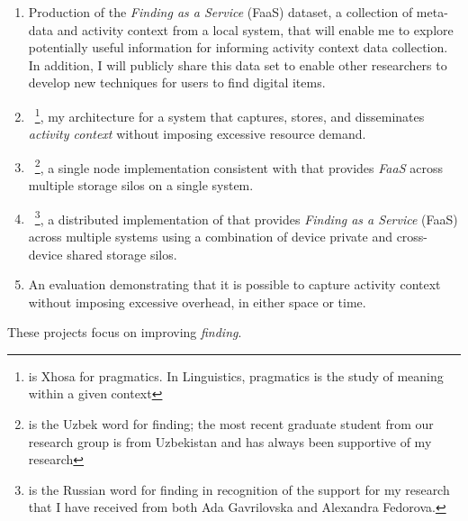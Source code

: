 \begin{enumerate}
    \item Production of the \emph{Finding as a Service} (FaaS) dataset, a
          collection of meta-data and activity context from a local system, that
          will enable me to explore potentially useful information for informing
          activity context data collection. In addition, I will publicly
          share this data set to enable other researchers to develop new
          techniques for users to find digital items.

    \item \system~\footnote{\system is Xhosa for pragmatics.  In Linguistics,
              pragmatics is the study of meaning within a given context}, my
          architecture for a system that captures, stores, and
          disseminates \emph{activity context} without imposing excessive resource
          demand.

    \item \systemone~\footnote{\systemone is the Uzbek word for finding; the most
              recent graduate student from our research group is from Uzbekistan and
              has always been supportive of my research}, a single node
          implementation consistent with \system that provides
          \emph{FaaS} across multiple storage silos on a single
          system.

    \item \systemtwo~\footnote{\systemtwo is the Russian word for finding in
              recognition of the support for my research that I have received from both Ada Gavrilovska and
              Alexandra Fedorova.}, a distributed implementation of \system that provides
          \emph{Finding as a Service} (FaaS) across multiple systems using a
          combination of device private and cross-device shared storage
          silos.

    \item An evaluation demonstrating that it is possible to capture activity
          context without imposing excessive overhead, in either space or time.

\end{enumerate}

These projects focus on improving \emph{finding}.

